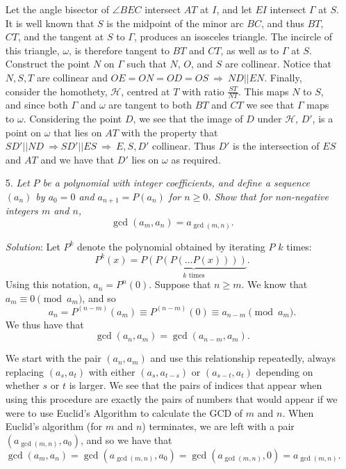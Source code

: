 \documentclass{article}
\begin{document}
\begin{enumerate}
Let the angle bisector of  $\angle BEC$ intersect $AT$ at $I$, and let $EI$ intersect $\Gamma$ at $S$. It is well known that $S$ is the midpoint of the minor arc $BC$, and thus $BT$, $CT$, and the tangent at $S$ to $\Gamma$, produces an isosceles triangle. The incircle of this triangle, $\omega$, is therefore tangent to $BT$ and $CT$, as well as to $\Gamma$ at $S$. Construct the point $N$ on $\Gamma$ such that $N$, $O$, and $S$ are collinear. Notice that $N,S,T$ are collinear and $OE=ON=OD=OS \ \Rightarrow \ ND || EN$. Finally, consider the homothety, $\mathcal{H}$, centred at $T$ with ratio $\frac{ST}{NT}$. This maps $N$ to $S$, and since both $\Gamma$ and $\omega$ are tangent to both $BT$ and $CT$ we see that $\Gamma$ maps to $\omega$. Considering the point $D$, we see that the image of $D$ under $\mathcal{H}$, $D'$, is a point on $\omega$ that lies on $AT$ with the property that $SD' || ND \ \Rightarrow SD' || ES \ \Rightarrow \ E,S,D'$ collinear. Thus $D'$ is the intersection of $ES$ and $AT$ and we have that $D'$ lies on $\omega$ as required. 

\item[5.] %
{\itshape
Let $P$ be a polynomial with integer coefficients, and define a sequence $(a_n)$ by $a_0 = 0$ and $a_{n+1} = P(a_n)$ for $n \geq 0$.
Show that for non-negative integers $m$ and $n$,
\[ \gcd(a_m,a_n) = a_{\gcd(m,n)}. \]
}

\textit{Solution}:
Let $P^k$ denote the polynomial obtained by iterating $P$ $k$ times: 
\[
	P^k(x) = \underbrace{P(P(P( \dots P(x))))}_{k \text{ times}}.
\]
Using this notation, $a_n = P^n (0)$.
Suppose that $n \geq m$. We know that $a_m \equiv 0 \pmod{a_m}$, and so
\[
	a_n = P^{(n - m)} (a_m) \equiv P^{(n - m)} (0) \equiv a_{n - m} \pmod{a_m}.
\]
We thus have that
\[
	\gcd(a_n, a_m) = \gcd(a_{n - m}, a_m).
\]

We start with the pair $(a_n, a_m)$ and use this relationship repeatedly, always replacing $(a_s, a_t)$ with either $(a_s, a_{t - s})$ or $(a_{s - t}, a_t)$ depending on whether $s$ or $t$ is larger. We see that the pairs of indices that appear when using this procedure are exactly the pairs of numbers that would appear if we were to use Euclid's Algorithm to calculate the GCD of $m$ and $n$. When Euclid's algorithm (for $m$ and $n$) terminates, we are left with a pair $(a_{\gcd(m, n)}, a_0)$, and so we have that
\[
	\gcd(a_m, a_n) = \gcd(a_{\gcd(m, n)}, a_0) = \gcd(a_{\gcd(m, n)}, 0) = a_{\gcd(m, n)}.
\]


\end{enumerate}
\end{document}
